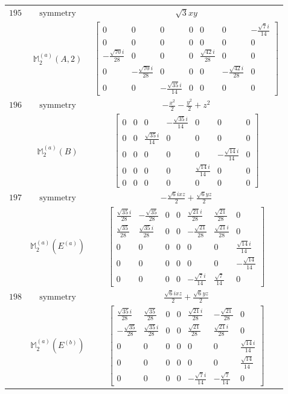 \documentclass[fleqn,8pt,landscape]{jsarticle}
\begin{document}
\begin{longtable}{ccc}
$ 195 $ & $ \text{symmetry} $ & $ \sqrt{3} x y $ \\
$  $ & $ \mathbb{M}_{2}^{(a)}(A,2) $ & $ \begin{bmatrix} 0 & 0 & 0 & 0 & 0 & 0 & - \frac{\sqrt{7} i}{14} \\ 0 & 0 & 0 & 0 & 0 & 0 & 0 \\ - \frac{\sqrt{70} i}{28} & 0 & 0 & 0 & \frac{\sqrt{42} i}{28} & 0 & 0 \\ 0 & - \frac{\sqrt{70} i}{28} & 0 & 0 & 0 & - \frac{\sqrt{42} i}{28} & 0 \\ 0 & 0 & - \frac{\sqrt{35} i}{14} & 0 & 0 & 0 & 0 \end{bmatrix} $ \\ \hline
$ 196 $ & $ \text{symmetry} $ & $ - \frac{x^{2}}{2} - \frac{y^{2}}{2} + z^{2} $ \\
$  $ & $ \mathbb{M}_{2}^{(a)}(B) $ & $ \begin{bmatrix} 0 & 0 & 0 & - \frac{\sqrt{35} i}{14} & 0 & 0 & 0 \\ 0 & 0 & \frac{\sqrt{35} i}{14} & 0 & 0 & 0 & 0 \\ 0 & 0 & 0 & 0 & 0 & - \frac{\sqrt{14} i}{14} & 0 \\ 0 & 0 & 0 & 0 & \frac{\sqrt{14} i}{14} & 0 & 0 \\ 0 & 0 & 0 & 0 & 0 & 0 & 0 \end{bmatrix} $ \\ \hline
$ 197 $ & $ \text{symmetry} $ & $ - \frac{\sqrt{6} i x z}{2} + \frac{\sqrt{6} y z}{2} $ \\
$  $ & $ \mathbb{M}_{2}^{(a)}(E^{(a)}) $ & $ \begin{bmatrix} \frac{\sqrt{35} i}{28} & - \frac{\sqrt{35}}{28} & 0 & 0 & \frac{\sqrt{21} i}{28} & \frac{\sqrt{21}}{28} & 0 \\ \frac{\sqrt{35}}{28} & \frac{\sqrt{35} i}{28} & 0 & 0 & - \frac{\sqrt{21}}{28} & \frac{\sqrt{21} i}{28} & 0 \\ 0 & 0 & 0 & 0 & 0 & 0 & \frac{\sqrt{14} i}{14} \\ 0 & 0 & 0 & 0 & 0 & 0 & - \frac{\sqrt{14}}{14} \\ 0 & 0 & 0 & 0 & - \frac{\sqrt{7} i}{14} & \frac{\sqrt{7}}{14} & 0 \end{bmatrix} $ \\ \hline
$ 198 $ & $ \text{symmetry} $ & $ \frac{\sqrt{6} i x z}{2} + \frac{\sqrt{6} y z}{2} $ \\
$  $ & $ \mathbb{M}_{2}^{(a)}(E^{(b)}) $ & $ \begin{bmatrix} \frac{\sqrt{35} i}{28} & \frac{\sqrt{35}}{28} & 0 & 0 & \frac{\sqrt{21} i}{28} & - \frac{\sqrt{21}}{28} & 0 \\ - \frac{\sqrt{35}}{28} & \frac{\sqrt{35} i}{28} & 0 & 0 & \frac{\sqrt{21}}{28} & \frac{\sqrt{21} i}{28} & 0 \\ 0 & 0 & 0 & 0 & 0 & 0 & \frac{\sqrt{14} i}{14} \\ 0 & 0 & 0 & 0 & 0 & 0 & \frac{\sqrt{14}}{14} \\ 0 & 0 & 0 & 0 & - \frac{\sqrt{7} i}{14} & - \frac{\sqrt{7}}{14} & 0 \end{bmatrix} $ \\ \hline

\end{longtable}
\end{document}
